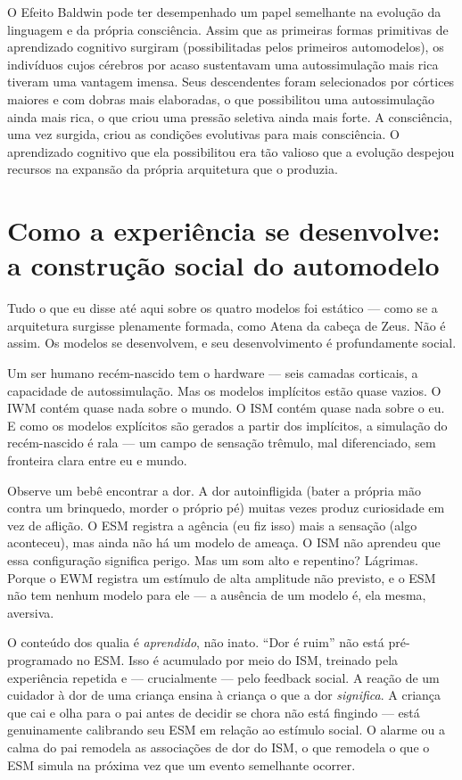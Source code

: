 \documentclass[11pt, twoside, openright]{book}
\begin{document}
O Efeito Baldwin pode ter desempenhado um papel semelhante na evolução da linguagem e da própria consciência. Assim que as primeiras formas primitivas de aprendizado cognitivo surgiram (possibilitadas pelos primeiros automodelos), os indivíduos cujos cérebros por acaso sustentavam uma autossimulação mais rica tiveram uma vantagem imensa. Seus descendentes foram selecionados por córtices maiores e com dobras mais elaboradas, o que possibilitou uma autossimulação ainda mais rica, o que criou uma pressão seletiva ainda mais forte. A consciência, uma vez surgida, criou as condições evolutivas para mais consciência. O aprendizado cognitivo que ela possibilitou era tão valioso que a evolução despejou recursos na expansão da própria arquitetura que o produzia.

\section*{Como a experiência se desenvolve: a construção social do automodelo}

Tudo o que eu disse até aqui sobre os quatro modelos foi estático --- como se a arquitetura surgisse plenamente formada, como Atena da cabeça de Zeus. Não é assim. Os modelos se desenvolvem, e seu desenvolvimento é profundamente social.

Um ser humano recém-nascido tem o hardware --- seis camadas corticais, a capacidade de autossimulação. Mas os modelos implícitos estão quase vazios. O IWM contém quase nada sobre o mundo. O ISM contém quase nada sobre o eu. E como os modelos explícitos são gerados a partir dos implícitos, a simulação do recém-nascido é rala --- um campo de sensação trêmulo, mal diferenciado, sem fronteira clara entre eu e mundo.

Observe um bebê encontrar a dor. A dor autoinfligida (bater a própria mão contra um brinquedo, morder o próprio pé) muitas vezes produz curiosidade em vez de aflição. O ESM registra a agência (eu fiz isso) mais a sensação (algo aconteceu), mas ainda não há um modelo de ameaça. O ISM não aprendeu que essa configuração significa perigo. Mas um som alto e repentino? Lágrimas. Porque o EWM registra um estímulo de alta amplitude não previsto, e o ESM não tem nenhum modelo para ele --- a ausência de um modelo é, ela mesma, aversiva.

O conteúdo dos qualia é \textit{aprendido}, não inato. ``Dor é ruim'' não está pré-programado no ESM. Isso é acumulado por meio do ISM, treinado pela experiência repetida e --- crucialmente --- pelo feedback social. A reação de um cuidador à dor de uma criança ensina à criança o que a dor \textit{significa}. A criança que cai e olha para o pai antes de decidir se chora não está fingindo --- está genuinamente calibrando seu ESM em relação ao estímulo social. O alarme ou a calma do pai remodela as associações de dor do ISM, o que remodela o que o ESM simula na próxima vez que um evento semelhante ocorrer.
\end{document}
